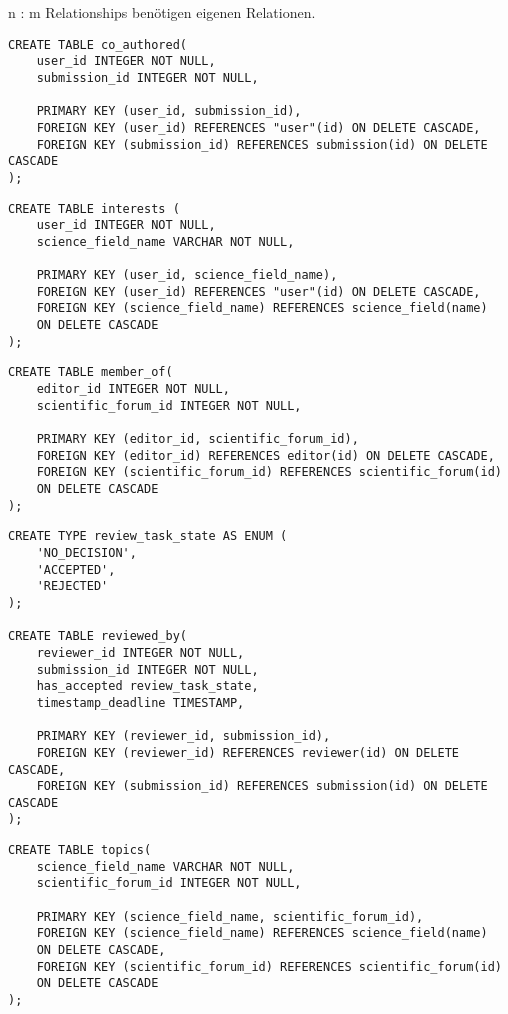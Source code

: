 n : m Relationships benötigen eigenen Relationen.\\

\begin{lstlisting}[caption={DDL der Ko-Autoren}]
CREATE TABLE co_authored(
	user_id INTEGER NOT NULL,
	submission_id INTEGER NOT NULL,

	PRIMARY KEY (user_id, submission_id),
	FOREIGN KEY (user_id) REFERENCES "user"(id) ON DELETE CASCADE,
	FOREIGN KEY (submission_id) REFERENCES submission(id) ON DELETE CASCADE
);
\end{lstlisting}

\begin{lstlisting}[caption={DDL der Interessensgebiete}]
CREATE TABLE interests (
	user_id INTEGER NOT NULL,
	science_field_name VARCHAR NOT NULL,

	PRIMARY KEY (user_id, science_field_name),
	FOREIGN KEY (user_id) REFERENCES "user"(id) ON DELETE CASCADE,
	FOREIGN KEY (science_field_name) REFERENCES science_field(name)
	ON DELETE CASCADE
);
\end{lstlisting}

\begin{lstlisting}[caption={DDL der verwaltenden Editoren}]
CREATE TABLE member_of(
	editor_id INTEGER NOT NULL,
	scientific_forum_id INTEGER NOT NULL,

	PRIMARY KEY (editor_id, scientific_forum_id),
	FOREIGN KEY (editor_id) REFERENCES editor(id) ON DELETE CASCADE,
	FOREIGN KEY (scientific_forum_id) REFERENCES scientific_forum(id)
	ON DELETE CASCADE
);
\end{lstlisting}

\begin{lstlisting}[caption={DDL der begutachtenden Gutachter}]
CREATE TYPE review_task_state AS ENUM (
	'NO_DECISION',
	'ACCEPTED',
	'REJECTED'
);

CREATE TABLE reviewed_by(
	reviewer_id INTEGER NOT NULL,
	submission_id INTEGER NOT NULL,
	has_accepted review_task_state,
	timestamp_deadline TIMESTAMP,

	PRIMARY KEY (reviewer_id, submission_id),
	FOREIGN KEY (reviewer_id) REFERENCES reviewer(id) ON DELETE CASCADE,
	FOREIGN KEY (submission_id) REFERENCES submission(id) ON DELETE CASCADE
);
\end{lstlisting}

\begin{lstlisting}[caption={DDL der Themengebiete eines Forums}]
CREATE TABLE topics(
	science_field_name VARCHAR NOT NULL,
	scientific_forum_id INTEGER NOT NULL,

	PRIMARY KEY (science_field_name, scientific_forum_id),
	FOREIGN KEY (science_field_name) REFERENCES science_field(name)
	ON DELETE CASCADE,
	FOREIGN KEY (scientific_forum_id) REFERENCES scientific_forum(id)
	ON DELETE CASCADE
);
\end{lstlisting}